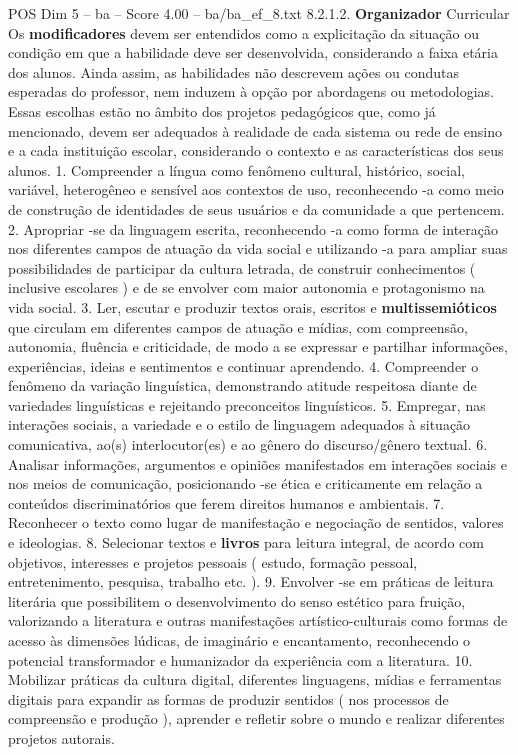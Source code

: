 \begin{textsample}{POS Dim 5 – ba – Score 4.00 – ba/ba\_ef\_8.txt}  \label{ex:f5_pos_278}
8.2.1.2. \textbf{Organizador} Curricular Os \textbf{modificadores} devem ser entendidos como a explicitação da situação ou condição em que a habilidade deve ser desenvolvida, considerando a faixa etária dos alunos.
Ainda assim, as habilidades não descrevem ações ou condutas esperadas do professor, nem induzem à opção por abordagens ou metodologias.
Essas escolhas estão no âmbito dos projetos pedagógicos que, como já mencionado, devem ser adequados à realidade de cada sistema ou rede de ensino e a cada instituição escolar, considerando o contexto e as características dos seus alunos. 1.
Compreender a língua como fenômeno cultural, histórico, social, variável, heterogêneo e sensível aos contextos de uso, reconhecendo -a como meio de construção de identidades de seus usuários e da comunidade a que pertencem. 2.
Apropriar -se da linguagem escrita, reconhecendo -a como forma de interação nos diferentes campos de atuação da vida social e utilizando -a para ampliar suas possibilidades de participar da cultura letrada, de construir conhecimentos ( inclusive escolares ) e de se envolver com maior autonomia e protagonismo na vida social. 3.
Ler, escutar e produzir textos orais, escritos e \textbf{multissemióticos} que circulam em diferentes campos de atuação e mídias, com compreensão, autonomia, fluência e criticidade, de modo a se expressar e partilhar informações, experiências, ideias e sentimentos e continuar aprendendo. 4.
Compreender o fenômeno da variação linguística, demonstrando atitude respeitosa diante de variedades linguísticas e rejeitando preconceitos linguísticos. 5.
Empregar, nas interações sociais, a variedade e o estilo de linguagem adequados à situação comunicativa, ao(s) interlocutor(es) e ao gênero do discurso/gênero textual. 6.
Analisar informações, argumentos e opiniões manifestados em interações sociais e nos meios de comunicação, posicionando -se ética e criticamente em relação a conteúdos discriminatórios que ferem direitos humanos e ambientais. 7.
Reconhecer o texto como lugar de manifestação e negociação de sentidos, valores e ideologias. 8.
Selecionar textos e \textbf{livros} para leitura integral, de acordo com objetivos, interesses e projetos pessoais ( estudo, formação pessoal, entretenimento, pesquisa, trabalho etc. ). 9.
Envolver -se em práticas de leitura literária que possibilitem o desenvolvimento do senso estético para fruição, valorizando a literatura e outras manifestações artístico-culturais como formas de acesso às dimensões lúdicas, de imaginário e encantamento, reconhecendo o potencial transformador e humanizador da experiência com a literatura. 10.
Mobilizar práticas da cultura digital, diferentes linguagens, mídias e ferramentas digitais para expandir as formas de produzir sentidos ( nos processos de compreensão e produção ), aprender e refletir sobre o mundo e realizar diferentes projetos autorais.

\end{textsample}
